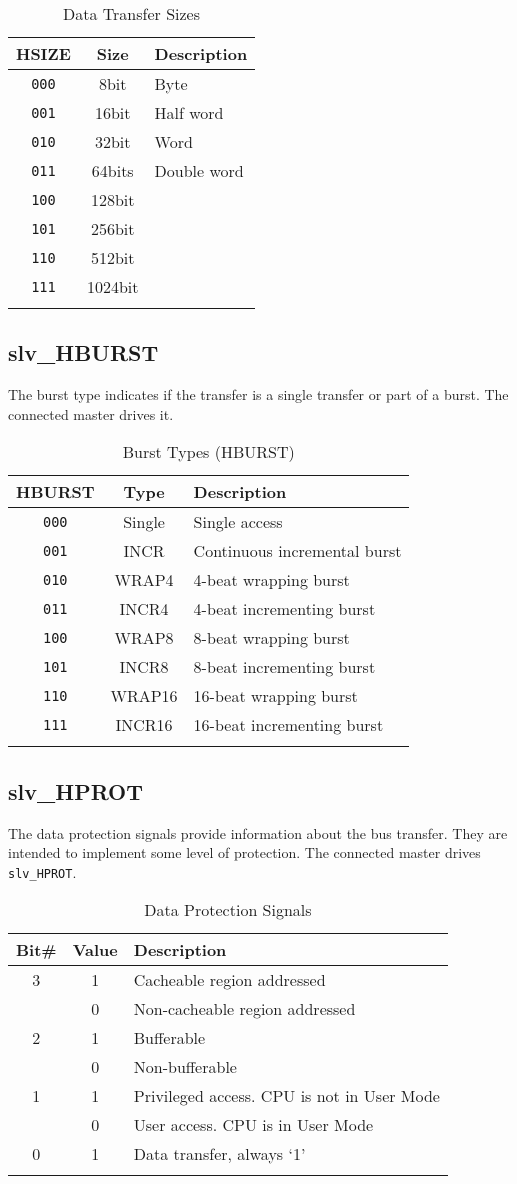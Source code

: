 \begin{longtable}[]{@{}ccl@{}}
\toprule
HSIZE & Size & Description\tabularnewline
\midrule
\endhead
\texttt{000} & 8bit    & Byte\tabularnewline
\texttt{001} & 16bit   & Half word\tabularnewline
\texttt{010} & 32bit   & Word\tabularnewline
\texttt{011} & 64bits  & Double word\tabularnewline
\texttt{100} & 128bit  & \tabularnewline
\texttt{101} & 256bit  & \tabularnewline
\texttt{110} & 512bit  & \tabularnewline
\texttt{111} & 1024bit & \tabularnewline
\bottomrule
\caption{Data Transfer Sizes}
\end{longtable}

\subsection{slv\_HBURST}\label{slv_hburst}

The burst type indicates if the transfer is a single transfer or part of
a burst. The connected master drives it.

\begin{longtable}[]{@{}ccl@{}}
\toprule
HBURST & Type & Description\tabularnewline
\midrule
\endhead
\texttt{000} & Single & Single access\tabularnewline
\texttt{001} & INCR   & Continuous incremental burst\tabularnewline
\texttt{010} & WRAP4  & 4-beat wrapping burst\tabularnewline
\texttt{011} & INCR4  & 4-beat incrementing burst\tabularnewline
\texttt{100} & WRAP8  & 8-beat wrapping burst\tabularnewline
\texttt{101} & INCR8  & 8-beat incrementing burst\tabularnewline
\texttt{110} & WRAP16 & 16-beat wrapping burst\tabularnewline
\texttt{111} & INCR16 & 16-beat incrementing burst\tabularnewline
\bottomrule
\caption{Burst Types (HBURST)}
\end{longtable}

\subsection{slv\_HPROT}\label{slv_hprot}

The data protection signals provide information about the bus transfer.
They are intended to implement some level of protection. The connected
master drives \texttt{slv\_HPROT}.

\begin{longtable}[]{@{}ccl@{}}
\toprule
Bit\# & Value & Description\tabularnewline
\midrule
\endhead
3 & 1 & Cacheable region addressed\tabularnewline
& 0 & Non-cacheable region addressed\tabularnewline
2 & 1 & Bufferable\tabularnewline
& 0 & Non-bufferable\tabularnewline
1 & 1 & Privileged access. CPU is not in User Mode\tabularnewline
& 0 & User access. CPU is in User Mode\tabularnewline
0 & 1 & Data transfer, always `1'\tabularnewline
\bottomrule
\caption{Data Protection Signals}
\end{longtable}

